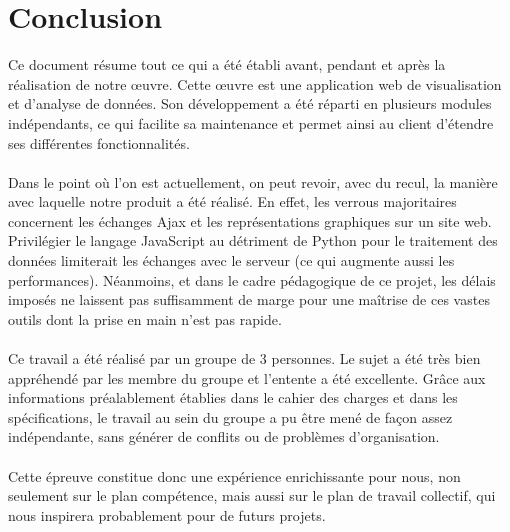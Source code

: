 	\section*{Conclusion}
	Ce document résume tout ce qui a été établi avant, pendant et après la réalisation de notre œuvre. Cette œuvre est une application web de visualisation et d'analyse de données. Son développement a été réparti en plusieurs modules indépendants, ce qui facilite sa maintenance et permet ainsi au client d'étendre ses différentes fonctionnalités.
	\paragraph{} Dans le point où l'on est actuellement, on peut revoir, avec du recul, la manière avec laquelle notre produit a été réalisé. En effet, les verrous majoritaires concernent les échanges Ajax et les représentations graphiques sur un site web. Privilégier le langage JavaScript au détriment de Python pour le traitement des données limiterait les échanges avec le serveur (ce qui augmente aussi les performances). Néanmoins, et dans le cadre pédagogique de ce projet, les délais imposés ne laissent pas suffisamment de marge pour une maîtrise de ces vastes outils dont la prise en main n'est pas rapide.
	\paragraph{} Ce travail a été réalisé par un groupe de 3 personnes. Le sujet a été très bien appréhendé par les membre du groupe et l'entente a été excellente. Grâce aux informations préalablement établies dans le cahier des charges et dans les spécifications, le travail au sein du groupe a pu être mené de façon assez indépendante, sans générer de conflits ou de problèmes d'organisation.
	\paragraph{} Cette épreuve constitue donc une expérience enrichissante pour nous, non seulement sur le plan compétence, mais aussi sur le plan de travail collectif, qui nous inspirera probablement pour de futurs projets.
		

